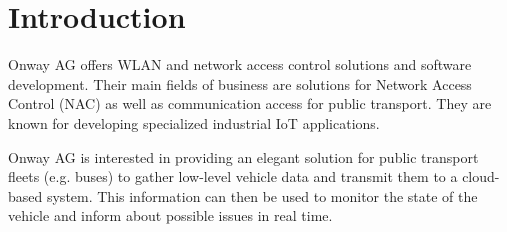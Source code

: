 \section{Introduction}
\label{sec:intro}
Onway AG offers WLAN and network access control solutions and software development. Their main fields of business are solutions for Network Access Control (NAC) as well as communication access for public transport. They are known for developing specialized industrial IoT applications.


Onway AG is interested in providing an elegant solution for public transport fleets (e.g. buses) to gather low-level vehicle data and transmit them to a cloud-based system.
This information can then be used to monitor the state of the vehicle and inform about possible issues in real time.